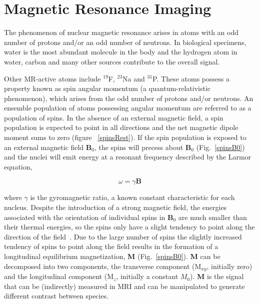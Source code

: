 \section{Magnetic Resonance Imaging}


The phenomenon of nuclear magnetic resonance arises in atoms with an odd number of protons and/or an odd number of neutrons. 
In biological specimens, water is the most abundant molecule in the body and the hydrogen atom in water, carbon and many other sources contribute to the overall signal. 

Other MR-active atoms include $^{19}$F, $^{23}$Na and $^{31}$P. 
These atoms possess a property known as spin angular momentum (a quantum-relativistic phenomenon), which arises from the odd number of protons and/or neutrons. 
An ensemble population of atoms possessing angular momentum are referred to as a population of spins. 
In the absence of an external magnetic field, a spin population is expected to point in all  directions and the net magnetic dipole moment sums to zero (figure ~\ref{spinsRest}). 
If the spin population is exposed to an external magnetic field \textbf{B$_0$}, the spins will precess about \textbf{B$_0$} (Fig.~\ref{spinsB0}) and the nuclei will emit energy at a resonant frequency described by the Larmor equation,
		
\begin{equation}
	\omega = \gamma \textbf{B}
\end{equation}
		

where $\gamma$ is the gyromagnetic ratio, a known constant characteristic for each nucleus. 
Despite the introduction of a strong magnetic field, the energies associated with the orientation of individual spins in \textbf{B$_0$} are much smaller than their thermal energies, so the spins only have a slight tendency to point along the direction of the field~\cite{Hanson:2008tp}. 
Due to the large number of spins the slightly increased tendency of spins to point along the field results in the formation of a longitudinal equilibrium magnetization, \textbf{M} (Fig.~\ref{spinsB0}). 
\textbf{M} can be decomposed into two components, the transverse component (M$_{xy}$, initially zero) and the longitudinal component (M$_{z}$, initially a constant $M_0$). 
\textbf{M} is the signal that can be (indirectly) measured in MRI and can be manipulated to generate different contrast between species.
 
